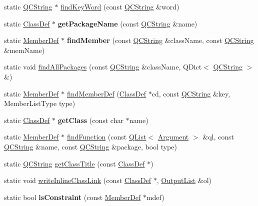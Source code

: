 \begin{DoxyCompactItemize}
\item 
static \hyperlink{class_q_c_string}{Q\-C\-String} $\ast$ \hyperlink{class_vhdl_doc_gen_a4dff15905a3ffe1ea3ad292b3220f03c}{find\-Key\-Word} (const \hyperlink{class_q_c_string}{Q\-C\-String} \&word)
\item 
\hypertarget{class_vhdl_doc_gen_a6eec66725963cb4a8b406e7e3415a32b}{static \hyperlink{class_class_def}{Class\-Def} $\ast$ {\bfseries get\-Package\-Name} (const \hyperlink{class_q_c_string}{Q\-C\-String} \&name)}\label{class_vhdl_doc_gen_a6eec66725963cb4a8b406e7e3415a32b}

\item 
\hypertarget{class_vhdl_doc_gen_abcebbb81dd5b8d8932a1f6bd40622b4d}{static \hyperlink{class_member_def}{Member\-Def} $\ast$ {\bfseries find\-Member} (const \hyperlink{class_q_c_string}{Q\-C\-String} \&class\-Name, const \hyperlink{class_q_c_string}{Q\-C\-String} \&mem\-Name)}\label{class_vhdl_doc_gen_abcebbb81dd5b8d8932a1f6bd40622b4d}

\item 
static void \hyperlink{class_vhdl_doc_gen_ac5e99a13af827855a33d709b978f66a4}{find\-All\-Packages} (const \hyperlink{class_q_c_string}{Q\-C\-String} \&class\-Name, Q\-Dict$<$ \hyperlink{class_q_c_string}{Q\-C\-String} $>$ \&)
\item 
static \hyperlink{class_member_def}{Member\-Def} $\ast$ \hyperlink{class_vhdl_doc_gen_ae133cc93c7238573d234f6e610d52529}{find\-Member\-Def} (\hyperlink{class_class_def}{Class\-Def} $\ast$cd, const \hyperlink{class_q_c_string}{Q\-C\-String} \&key, Member\-List\-Type type)
\item 
\hypertarget{class_vhdl_doc_gen_a976b42d4f982a481d6065d0fa0934f64}{static \hyperlink{class_class_def}{Class\-Def} $\ast$ {\bfseries get\-Class} (const char $\ast$name)}\label{class_vhdl_doc_gen_a976b42d4f982a481d6065d0fa0934f64}

\item 
static \hyperlink{class_member_def}{Member\-Def} $\ast$ \hyperlink{class_vhdl_doc_gen_aad227f9422838f2eb6407d93b7e2a756}{find\-Function} (const \hyperlink{class_q_list}{Q\-List}$<$ \hyperlink{struct_argument}{Argument} $>$ \&ql, const \hyperlink{class_q_c_string}{Q\-C\-String} \&name, const \hyperlink{class_q_c_string}{Q\-C\-String} \&package, bool type)
\item 
static \hyperlink{class_q_c_string}{Q\-C\-String} \hyperlink{class_vhdl_doc_gen_a81f4fb8a32f2a6f3231ec024854f89b7}{get\-Class\-Title} (const \hyperlink{class_class_def}{Class\-Def} $\ast$)
\item 
static void \hyperlink{class_vhdl_doc_gen_a41e9c8e2d0a3cffea74d9daaac90e52b}{write\-Inline\-Class\-Link} (const \hyperlink{class_class_def}{Class\-Def} $\ast$, \hyperlink{class_output_list}{Output\-List} \&ol)
\item 
\hypertarget{class_vhdl_doc_gen_a9b4501165d95c549d49c0367a9097de8}{static bool {\bfseries is\-Constraint} (const \hyperlink{class_member_def}{Member\-Def} $\ast$mdef)}\label{class_vhdl_doc_gen_a9b4501165d95c549d49c0367a9097de8}


\end{DoxyCompactItemize}
